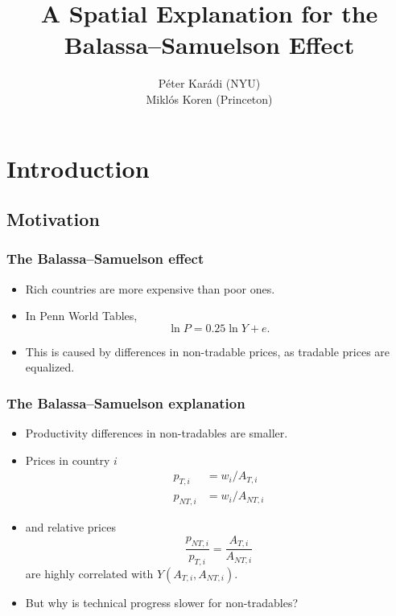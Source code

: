 \documentclass[compress,mathserif]{beamer}
\title[Balassa--Samuelson]%
{A Spatial Explanation for the Balassa--Samuelson Effect}
\author[Kar\'adi and Koren] %
{P\'eter Kar\'adi (NYU)\\
Mikl\'os Koren (Princeton)}
\date %
{}
\begin{document}
\begin{frame}[plain]
  \titlepage
    \addtocounter{framenumber}{-1}
\end{frame}


\section{Introduction}
\subsection{Motivation}
\begin{frame}\frametitle{The Balassa--Samuelson effect}

\begin{itemize}
    \item Rich countries are more expensive than poor ones.
    \item In Penn World Tables,
    \[
    \ln P = 0.25\ln Y + e.
    \]
    \item This is caused by differences in non-tradable prices, as tradable prices are equalized.
\end{itemize}
\end{frame}


\begin{frame}\frametitle{The Balassa--Samuelson explanation}

\begin{itemize}
    \item Productivity differences in non-tradables are smaller.
    \item Prices in country $i$
    \begin{align*}
    p_{T,i} &= w_i/A_{T,i}\\
    p_{NT,i} &= w_i/A_{NT,i}
    \end{align*}
    \item and relative prices
    \[
    \frac{p_{NT,i}}{p_{T,i}} = \frac{A_{T,i}}{A_{NT,i}}
    \]
    are highly correlated with $Y(A_{T,i},A_{NT,i})$.
    \item But why is technical progress slower for non-tradables?
\end{itemize}
\end{frame}
\end{document}
